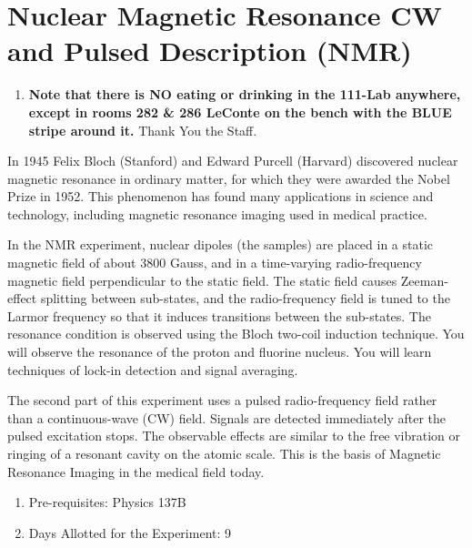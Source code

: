 \documentclass{../lab}
\begin{document}
\maketitle

\tableofcontents

\section{Nuclear Magnetic Resonance CW and Pulsed Description (NMR)}

\begin{enumerate}
    \item \textbf{Note that there is NO eating or drinking in the 111-Lab anywhere, except in rooms 282 \& 286 LeConte on the bench with the BLUE stripe around it.} Thank You the Staff.
\end{enumerate}

In 1945 Felix Bloch (Stanford) and Edward Purcell (Harvard) discovered nuclear magnetic resonance in ordinary matter, for which they were awarded the Nobel Prize in 1952. This phenomenon has found many applications in science and technology, including magnetic resonance imaging used in medical practice.

In the NMR experiment, nuclear dipoles (the samples) are placed in a static magnetic field of about 3800 Gauss, and in a time-varying radio-frequency magnetic field perpendicular to the static field. The static field causes Zeeman-effect splitting between sub-states, and the radio-frequency field is tuned to the Larmor frequency so that it induces transitions between the sub-states. The resonance condition is observed using the Bloch two-coil induction technique. You will observe the resonance of the proton and fluorine nucleus. You will learn techniques of lock-in detection and signal averaging.

The second part of this experiment uses a pulsed radio-frequency field rather than a continuous-wave (CW) field. Signals are detected immediately after the pulsed excitation stops. The observable effects are similar to the free vibration or ringing of a resonant cavity on the atomic scale. This is the basis of Magnetic Resonance Imaging in the medical field today.

\begin{enumerate}
    \item Pre-requisites: Physics 137B

    \item Days Allotted for the Experiment: 9

\end{enumerate}
\end{document}
